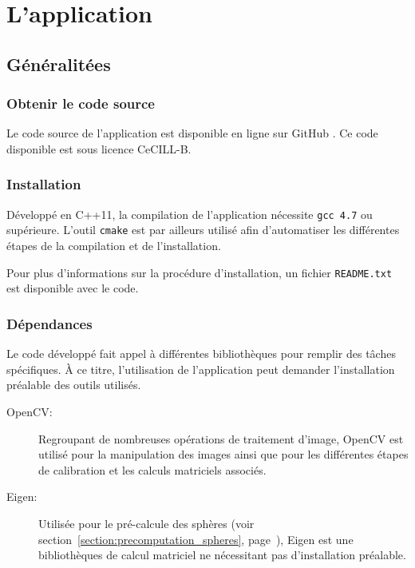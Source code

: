 \documentclass[10pt,a4paper,twoside, twocolumn]{report}
\begin{document}
\chapter{L’application}




\section{Généralitées}
\subsection{Obtenir le code source}

Le code source de l’application est disponible en ligne sur GitHub . Ce code disponible est sous licence CeCILL-B.


\subsection{Installation}

Développé en C++11, la compilation de l’application nécessite \texttt{gcc 4.7} ou supérieure. L’outil \texttt{cmake} est par ailleurs utilisé afin d’automatiser les différentes étapes de la compilation et de l’installation.

Pour plus d’informations sur la procédure d’installation, un fichier \texttt{README.txt} est disponible avec le code.

\subsection{Dépendances}

Le code développé fait appel à différentes bibliothèques pour remplir des tâches spécifiques. À ce titre, l’utilisation de l’application peut demander l’installation préalable des outils utilisés.

\begin{description}
	\item[OpenCV:] Regroupant de nombreuses opérations de traitement d’image, OpenCV est utilisé pour la manipulation des images ainsi que pour les différentes étapes de calibration et les calculs matriciels associés.
	\item[Eigen:] Utilisée pour le pré-calcule des sphères (voir section~\ref{section:precomputation_spheres}, page~\pageref{section:precomputation_spheres}), Eigen est une bibliothèques de calcul matriciel ne nécessitant pas d’installation préalable.
\end{description}
\end{document}
